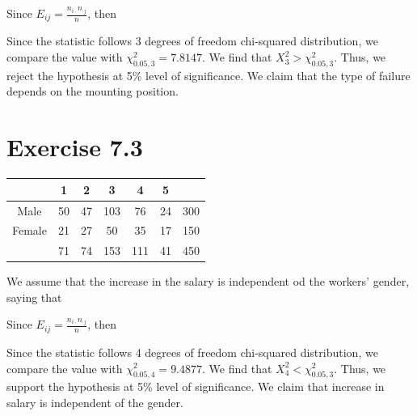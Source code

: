 
Since $E_{ij}=\frac{n_{i\cdot}n_{\cdot j}}{n}$, then


Since the statistic follows 3 degrees of freedom chi-squared distribution, we compare the value with $\chi_{0.05,3}^2=7.8147$. We find that $X_3^2>\chi_{0.05,3}^2$. Thus, we reject the hypothesis at 5\% level of significance. We claim that the type of failure depends on the mounting position.

\section*{Exercise 7.3}
\begin{table}[h]
    \centering
    \begin{tabular}{c|ccccc|c}
        & 1 & 2 & 3 & 4 & 5 &\\\hline
        Male & 50 &47 & 103 & 76 & 24 & 300\\
        Female & 21 & 27 & 50 & 35 & 17 & 150\\\hline
        & 71 & 74 & 153 & 111 & 41 & 450\\
    \end{tabular}
\end{table}
We assume that the increase in the salary is independent od the workers' gender, saying that

Since $E_{ij}=\frac{n_{i\cdot}n_{\cdot j}}{n}$, then


Since the statistic follows 4 degrees of freedom chi-squared distribution, we compare the value with $\chi_{0.05,4}^2=9.4877$. We find that $X_4^2<\chi_{0.05,3}^2$. Thus, we support the hypothesis at 5\% level of significance. We claim that increase in salary is independent of the gender.

